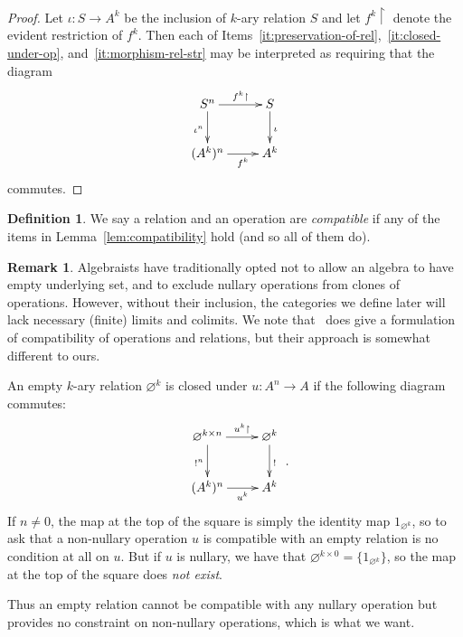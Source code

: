 \documentclass[11pt, a4paper, twoside,leqno]{amsart}
\newcommand{\cd}[2][]{\vcenter{\hbox{\xymatrix#1{#2}}}}
\numberwithin{equation}{section}
\theoremstyle{plain}
\theoremstyle{definition}
\newtheorem{Defn}[Thm]{Definition}
\newtheorem{Rk}[Thm]{Remark}
\renewcommand{\emptyset}{\varnothing}
\renewcommand{\emptyset}{\varnothing}
\begin{document}
\begin{proof}
  Let \(\iota \colon S \rightarrow
  A^{k}\) be the inclusion of \(k\)-ary
  relation \(S\) and let \(f^{k}\!\upharpoonright\) denote the evident
  restriction of \(f^{k}\). Then each of Items~\ref{it:preservation-of-rel},~\ref{it:closed-under-op},
  and~\ref{it:morphism-rel-str} may be interpreted as requiring that the diagram
  \begin{equation*}
    \cd{
      {S^{n}} \ar[r]^-{f^{k}\upharpoonright}
      \ar[d]_{\iota^{n}} &
      {S} \ar[d]^{\iota} \\
      {(A^{k})^{n}} \ar[r]_-{f^{k}} &
      {A^{k}}
    } 
  \end{equation*}
  commutes.
\end{proof}


\begin{Defn}
  \label{def:3}
  We say a relation and an operation are \emph{compatible} if any of the
  items in Lemma~\ref{lem:compatibility} hold (and so all of them do).
\end{Defn}


\begin{Rk}
  \label{rk:es-nullaries}
  Algebraists have traditionally opted not to allow an algebra to have
  empty underlying set, and to exclude nullary
  operations from clones of operations. However, without their inclusion, the categories we define
  later will lack necessary (finite) limits and colimits. We note that~\cite{Behrisch:2014aa} does give a formulation of
  compatibility of operations and relations, but their approach is
  somewhat different to ours.
 
  
  An empty \(k\)-ary relation \(\emptyset{}^{k}\)
  is closed under \(u \colon A^{n} \rightarrow A\)  if the following
  diagram commutes:
  \begin{equation*}
    \cd{
      {\emptyset{}^{k\times n}} \ar[r]^-{u^{k}\upharpoonright}
      \ar[d]_{!^{n}} &
      {\emptyset{}^{k}} \ar[d]^{!} \\
      {(A^{k})^{n}} \ar[r]_-{u^{k}} &
      {A^{k}}
    } \rlap{ .}
  \end{equation*}
  If \(n \neq 0\), the map at the top of the
  square is simply the identity map \(1_{\emptyset{}^{k}}\), so to ask
  that a non-nullary operation \(u\) is compatible with an empty
  relation is no condition at all on \(u\).
  But if \(u\) is nullary, we have that \(\emptyset{}^{k\times 0} = \{1_{\emptyset{}^{k}}\}\), so the
  map at the top of the square does {\it not exist}.

  Thus an empty relation cannot be compatible with any nullary
  operation but provides no constraint on non-nullary operations, which is what we
  want.
\end{Rk}
\end{document}
